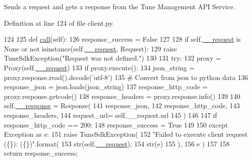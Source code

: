 Sends a request and gets a response from the Tune Management A\-P\-I Service. 



Definition at line 124 of file client.\-py.


\begin{DoxyCode}
124 
125     \textcolor{keyword}{def }\hyperlink{classtune_1_1management_1_1service_1_1client_1_1TuneManagementClient_a9a6fb9b3cbb0e578a1cd53fb8a39f6a7}{call}(self):
126         response\_success = \textcolor{keyword}{False}
127 
128         \textcolor{keywordflow}{if} self.\hyperlink{classtune_1_1management_1_1service_1_1client_1_1TuneManagementClient_a2e3f42c415bc8c9bdaf55f75acddbbd5}{\_\_request} \textcolor{keywordflow}{is} \textcolor{keywordtype}{None} \textcolor{keywordflow}{or} \textcolor{keywordflow}{not} isinstance(self.\hyperlink{classtune_1_1management_1_1service_1_1client_1_1TuneManagementClient_a2e3f42c415bc8c9bdaf55f75acddbbd5}{\_\_request}, Request):
129             \textcolor{keywordflow}{raise} TuneSdkException(\textcolor{stringliteral}{"Request was not defined."})
130 
131         \textcolor{keywordflow}{try}:
132             proxy = Proxy(self.\hyperlink{classtune_1_1management_1_1service_1_1client_1_1TuneManagementClient_a2e3f42c415bc8c9bdaf55f75acddbbd5}{\_\_request})
133             \textcolor{keywordflow}{if} proxy.execute():
134                 json\_string = proxy.response.read().decode(\textcolor{stringliteral}{'utf-8'})
135                 \textcolor{comment}{# Convert from json to python data}
136                 response\_json = json.loads(json\_string)
137                 response\_http\_code = proxy.response.getcode()
138                 response\_headers = proxy.response.info()
139 
140                 self.\hyperlink{classtune_1_1management_1_1service_1_1client_1_1TuneManagementClient_a07773038d49e05c7e999a687f477e418}{\_\_response} = Response(
141                     response\_json,
142                     response\_http\_code,
143                     response\_headers,
144                     request\_url= self.\_\_request.url
145                     )
146 
147                 \textcolor{keywordflow}{if} response\_http\_code == 200:
148                     response\_success = \textcolor{keyword}{True}
149 
150         \textcolor{keywordflow}{except} Exception \textcolor{keyword}{as} e:
151             \textcolor{keywordflow}{raise} TuneSdkException(
152                 \textcolor{stringliteral}{"Failed to execute client request (\{\}): (\{\})"}.format(
153                     str(self.\hyperlink{classtune_1_1management_1_1service_1_1client_1_1TuneManagementClient_a2e3f42c415bc8c9bdaf55f75acddbbd5}{\_\_request}),
154                     str(e)
155                     ),
156                 e )
157 
158         \textcolor{keywordflow}{return} response\_success;

\end{DoxyCode}
